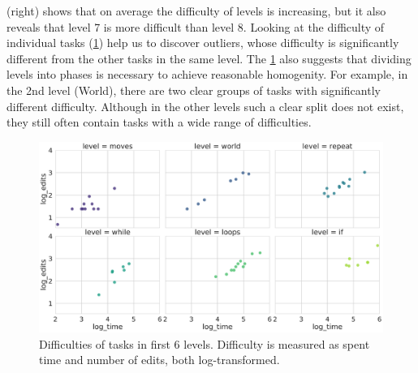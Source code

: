  (right) shows that on average the difficulty of levels
is increasing, but it also reveals that level 7 is more difficult than level 8.
Looking at the difficulty of individual tasks (\cref{fig:difficulties-tasks-levels})
help us to discover outliers, whose difficulty is significantly
different from the other tasks in the same level.
The \cref{fig:difficulties-tasks-levels} also suggests that dividing levels
into phases is necessary to achieve reasonable homogenity. For example, in the 2nd
level (World), there are two clear groups of tasks with significantly different
difficulty. Although in the other levels such a clear split does not exist,
they still often contain tasks with a wide range of difficulties.

\begin{figure}[htb]
\centering
\includegraphics[width=\textwidth]{img/difficulties-tasks-levels}
\caption{%
  Difficulties of tasks in first 6 levels.
  Difficulty is measured as spent time and number of edits, both log-transformed.}
\label{fig:difficulties-tasks-levels}
\end{figure}

